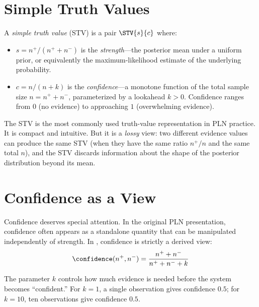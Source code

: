 \documentclass[11pt,openany]{report}
\begin{document}
\section{Simple Truth Values}

A \emph{simple truth value} (STV) is a pair $\STV{s}{c}$ where:
\begin{itemize}
\item $s = n^+ / (n^+ + n^-)$ is the \emph{strength}---the posterior mean
  under a uniform prior, or equivalently the maximum-likelihood estimate
  of the underlying probability.
\item $c = n / (n + k)$ is the \emph{confidence}---a monotone function of
  the total sample size $n = n^+ + n^-$, parameterized by a lookahead
  $k > 0$.  Confidence ranges from $0$ (no evidence) to approaching $1$
  (overwhelming evidence).
\end{itemize}

The STV is the most commonly used truth-value representation in PLN
practice.  It is compact and intuitive.  But it is a \emph{lossy} view:
two different evidence values can produce the same STV (when they have
the same ratio $n^+/n$ and the same total $n$), and the STV discards
information about the shape of the posterior distribution beyond its
mean.


\section{Confidence as a View}

Confidence deserves special attention.  In the original PLN presentation,
confidence often appears as a standalone quantity that can be manipulated
independently of strength.  In \xiPLN{}, confidence is strictly a derived
view:
\[
  \confidence(n^+, n^-) = \frac{n^+ + n^-}{n^+ + n^- + k}
\]

The parameter $k$ controls how much evidence is needed before the system
becomes ``confident.''  For $k = 1$, a single observation gives
confidence $0.5$; for $k = 10$, ten observations give confidence
$0.5$.
\end{document}
